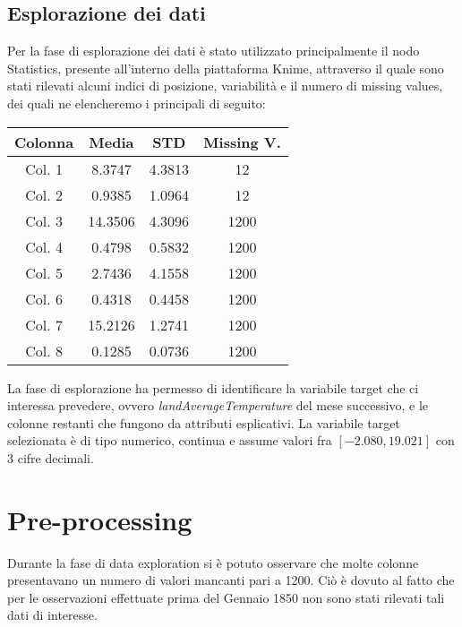 \documentclass[10pt, a4paper, twocolumn]{article} %
\begin{document}
\subsection{Esplorazione dei dati}
Per la fase di esplorazione dei dati è stato utilizzato principalmente il nodo Statistics, presente all'interno della piattaforma Knime, attraverso il quale sono stati rilevati alcuni indici di posizione, variabilità e il numero di missing values, dei quali ne elencheremo i principali di seguito:
%
\begin{center}
\begin{tabular}{||c c c c||} 
 \hline
 Colonna  & Media & STD & Missing V. \\ [0.5ex] 
 \hline\hline
	Col. 1 &   8.3747 & 4.3813 & 12 \\
\hline\hline
	Col. 2 &   0.9385& 1.0964 & 12 \\
	\hline\hline
	Col. 3 & 14.3506 & 4.3096 & 1200 \\
	\hline\hline
	Col. 4 & 0.4798 & 0.5832 & 1200 \\
	\hline\hline
	Col. 5 &2.7436 & 4.1558 & 1200 \\
	\hline\hline
	Col. 6 & 0.4318 & 0.4458 & 1200 \\
	\hline\hline
	Col. 7 & 15.2126 & 1.2741 & 1200 \\
	\hline\hline
	Col. 8 & 0.1285 & 0.0736 & 1200 \\[0.5ex] \hline 
\end{tabular}
\end{center}

La fase di esplorazione ha permesso di identificare la variabile target che ci interessa prevedere, ovvero \textit{landAverageTemperature} del mese successivo, e le colonne restanti che fungono da attributi esplicativi.
La variabile target selezionata è di tipo numerico, continua e assume valori fra $[-2.080, 19.021]$ con 3 cifre decimali.

\section{Pre-processing}
Durante la fase di data exploration si è potuto osservare che molte colonne presentavano un numero di valori mancanti pari a 1200. Ciò è dovuto al fatto che per le osservazioni effettuate prima del Gennaio 1850 non sono stati rilevati tali dati di interesse. 
\end{document}
